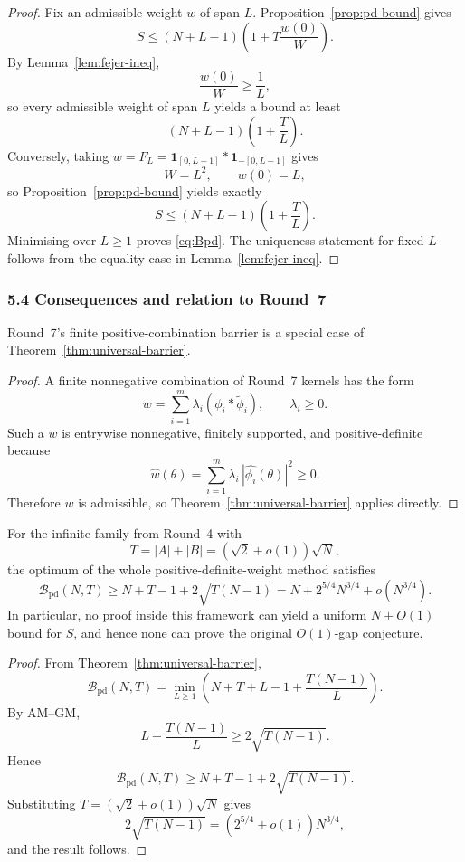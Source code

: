 \begin{proof}
Fix an admissible weight $w$ of span $L$.  Proposition~\ref{prop:pd-bound} gives
\[
S\le (N+L-1)\left(1+T\frac{w(0)}{W}\right).
\]
By Lemma~\ref{lem:fejer-ineq},
\[
\frac{w(0)}{W}\ge \frac1L,
\]
so every admissible weight of span $L$ yields a bound at least
\[
(N+L-1)\left(1+\frac{T}{L}\right).
\]
Conversely, taking $w=F_L=\mathbf 1_{[0,L-1]}*\mathbf 1_{-[0,L-1]}$ gives
\[
W=L^2,
\qquad
w(0)=L,
\]
so Proposition~\ref{prop:pd-bound} yields exactly
\[
S\le (N+L-1)\left(1+\frac{T}{L}\right).
\]
Minimising over $L\ge 1$ proves \eqref{eq:Bpd}.  The uniqueness statement for fixed $L$ follows from the equality case in Lemma~\ref{lem:fejer-ineq}.
\end{proof}

\subsubsection{5.4 Consequences and relation to Round~7}

\begin{corollary}
\label{cor:subsumes-r7}
Round~7's finite positive-combination barrier is a special case of Theorem~\ref{thm:universal-barrier}.
\end{corollary}

\begin{proof}
A finite nonnegative combination of Round~7 kernels has the form
\[
w=\sum_{i=1}^m \lambda_i (\phi_i*\widetilde\phi_i),
\qquad \lambda_i\ge0.
\]
Such a $w$ is entrywise nonnegative, finitely supported, and positive-definite because
\[
\widehat w(\theta)=\sum_{i=1}^m \lambda_i\,|\widehat{\phi_i}(\theta)|^2\ge 0.
\]
Therefore $w$ is admissible, so Theorem~\ref{thm:universal-barrier} applies directly.
\end{proof}

\begin{corollary}
\label{cor:n34}
For the infinite family from Round~4 with
\[
T=|A|+|B|=(\sqrt2+o(1))\sqrt N,
\]
the optimum of the whole positive-definite-weight method satisfies
\[
\mathcal B_{\mathrm{pd}}(N,T)
\ge N+T-1+2\sqrt{T(N-1)}
= N+2^{5/4}N^{3/4}+o(N^{3/4}).
\]
In particular, no proof inside this framework can yield a uniform $N+O(1)$ bound for $S$, and hence none can prove the original $O(1)$-gap conjecture.
\end{corollary}

\begin{proof}
From Theorem~\ref{thm:universal-barrier},
\[
\mathcal B_{\mathrm{pd}}(N,T)=\min_{L\ge 1}\left(N+T+L-1+\frac{T(N-1)}{L}\right).
\]
By AM--GM,
\[
L+\frac{T(N-1)}{L}\ge 2\sqrt{T(N-1)}.
\]
Hence
\[
\mathcal B_{\mathrm{pd}}(N,T)\ge N+T-1+2\sqrt{T(N-1)}.
\]
Substituting $T=(\sqrt2+o(1))\sqrt N$ gives
\[
2\sqrt{T(N-1)}=(2^{5/4}+o(1))N^{3/4},
\]
and the result follows.
\end{proof}

